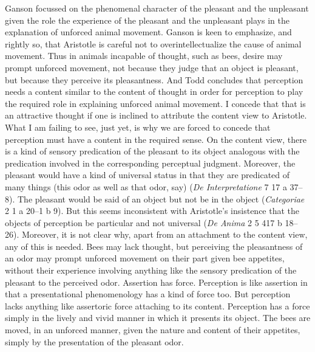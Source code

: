 \documentclass[12pt]{article}
\begin{document}
Ganson focussed on the phenomenal character of the pleasant and the unpleasant given the role the experience of the pleasant and the unpleasant plays in the explanation of unforced animal movement. Ganson is keen to emphasize, and rightly so, that Aristotle is careful not to overintellectualize the cause of animal movement. Thus in animals incapable of thought, such as bees, desire may prompt unforced movement, not because they judge that an object is pleasant, but because they perceive its pleasantness. And Todd concludes that perception needs a content  similar to the content of thought in order for perception to play the required role in explaining unforced animal movement. I concede that that is an attractive thought if one is inclined to attribute the content view to Aristotle. What I am failing to see, just yet, is why we are forced to concede that perception must have a content in the required sense. On the content view, there is a kind of sensory predication of the pleasant to its object analogous with the predication involved in the corresponding perceptual judgment. Moreover, the pleasant would have a kind of universal status in that they are predicated of many things (this odor as well as that odor, say) (\emph{De Interpretatione} 7 17 a 37--8). The pleasant would be said of an object but not be in the object (\emph{Categoriae} 2 1 a 20--1 b 9). But this seems inconsistent with Aristotle's insistence that the objects of perception be particular and not universal (\emph{De Anima} 2 5 417 b 18--26). Moreover, it is not clear why, apart from an attachment to the content view, any of this is needed. Bees may lack thought, but perceiving the pleasantness of an odor may prompt unforced movement on their part given bee appetites, without their experience involving anything like the sensory predication of the pleasant to the perceived odor. Assertion has force. Perception is like assertion in that a presentational phenomenology has a kind of force too. But perception lacks anything like assertoric force attaching to its content. Perception has a force simply in the lively and vivid manner in which it presents its object. The bees are moved, in an unforced manner, given the nature and content of their appetites, simply by the presentation of the pleasant odor.













\end{document}
